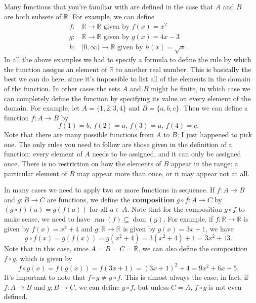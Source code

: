 \documentclass[letterpaper,12pt]{article}
\newcommand{\R}{\mathbb{R}}
\DeclareMathOperator{\ran}{ran}
\DeclareMathOperator{\dom}{dom}
\begin{document}
Many functions that you're familiar with are defined in the case that $A$ and $B$ are both subsets of $\R$. For example, we can define
\begin{align*}
 f: &\R\to \R  \text{ given by } f(x) = x^2\\
 g: &\R\to \R  \text{ given by } g(x) = 4x-3\\
 h: &[0,\infty)\to \R  \text{ given by } h(x) = \sqrt{x}.
\end{align*}
In all the above examples we had to specify a formula to define the rule by which the function assigns an element of $\R$ to another real number. This is basically the best we can do here, since it's impossible to list all of the elements in the domain of the function. In other cases the sets $A$ and $B$ might be finite, in which case we can completely define the function by specifying its value on every element of the domain. For example, let $A= \{1,2,3,4\}$ and $B = \{a,b,c\}$. Then we can define a function $f:A\to B$ by
\[
 f(1) = b, \, f(2) = a,\, f(3) = a,\, f(4) = c.
\]
Note that there are many possible functions from $A$ to $B$; I just happened to pick one. The only rules you need to follow are those given in the definition of a function: every element of $A$ needs to be assigned, and it can only be assigned once. There is no restriction on how the elements of $B$ appear in the range: a particular element of $B$ may appear more than once, or it may appear not at all. 

In many cases we need to apply two or more functions in sequence. If $f:A\to B$ and $g:B\to C$ are functions, we define the {\bf composition} $g\circ f:A\to C$ by $(g\circ f)(a)=g(f(a))$ for all $a\in A$. Note that for the composition $g\circ f$ to make sense, we need to have $\ran(f)\subseteq \dom(g)$. For example, if $f:\R\to \R$ is given by $f(x)=x^2+4$ and $g:\R\to \R$ is given by $g(x) = 3x+1$, we have
\[
g\circ f(x) = g(f(x)) = g(x^2+4) = 3(x^2+4)+1 = 3x^2+13.
\]
Note that in this case, since $A=B=C=\R$, we can also define the composition $f\circ g$, which is given by
\[
f\circ g(x) = f(g(x)) = f(3x+1) = (3x+1)^2+4 = 9x^2+6x+5.
\]
It's important to note that $f\circ g \neq g\circ f$. This is almost always the case; in fact, if $f:A\to B$ and $g:B\to C$, we can define $g\circ f$, but unless $C=A$, $f\circ g$ is not even defined.
\end{document}
